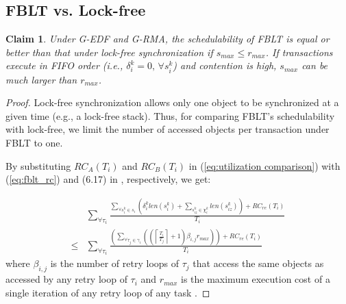 \documentclass[prodmode,acmtecs]{acmsmall}
\newtheorem{clm}{Claim}
\begin{document}
\begin{compactenum}
\subsection{FBLT vs. Lock-free}
\label{sec:fblt vs lock free}

\begin{clm}\label{clm:fblt_edf_lock-free}
Under G-EDF and G-RMA, the schedulability of FBLT is equal or better than
that under lock-free synchronization if $s_{max}\le r_{max}$. If transactions execute in FIFO
order (i.e., $\delta_{i}^{k}=0,\,\forall s_{i}^{k}$) and contention
is high, $s_{max}$ can be much larger than $r_{max}$.
\end{clm}
\begin{proof}
Lock-free synchronization \cite{key-5,Herlihy:2006:AMP:1146381.1146382} allows only one object to be synchronized at a given time (e.g., a lock-free stack). 
Thus, for comparing FBLT's schedulability with lock-free, we limit the number of accessed objects per transaction under FBLT to one. 

By substituting $RC_{A}(T_{i})$ and $RC_{B}(T_{i})$ in (\ref{eq:utilization comparison})
with (\ref{eq:fblt_rc}) and (6.17) in \cite{shambake_phd_proposal}, 
respectively, we get:

\begin{eqnarray}
 & \sum_{\forall\tau_{i}}\frac{\sum_{\forall s_{i}^{k}\in s_{i}}\left(\delta_{i}^{k}len(s_{i}^{k})+\sum_{s_{iz}^{k}\in\chi_{i}^{k}}len(s_{iz}^{k})\right)+RC_{re}(T_{i})}{T_{i}}\label{eq:fblt_lf_comparison_1}\\
\le & \sum_{\forall\tau_{i}}\frac{\left(\sum_{\forall\tau_{j}\in\gamma_{i}}\left(\left(\left\lceil \frac{T_{i}}{T_{j}}\right\rceil +1\right)\beta_{i,j}r_{max}\right)\right)+RC_{re}(T_{i})}{T_{i}}\nonumber 
\end{eqnarray}
where $\beta_{i,j}$ is the number of retry loops of $\tau_{j}$ that
access the same objects as accessed by any retry loop of $\tau_{i}$
\cite{key-5} and $r_{max}$ is the maximum execution cost of a single
iteration of any retry loop of any task \cite{key-5}. 



\end{proof}
\end{compactenum}
\end{document}
